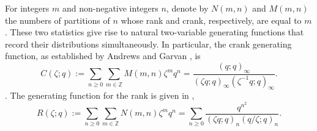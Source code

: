 \documentclass[12pt,oneside,reqno]{amsart}
\numberwithin{equation}{section}
\begin{document}
% 
For integers $m$ and non-negative integers $n$, denote by $N(m,n)$ and $M(m,n)$ the numbers of partitions of $n$ whose rank and crank, respectively, are equal to $m$. These two statistics give rise to natural two-variable generating functions that record their distributions simultaneously. In particular, the crank generating function, as established by Andrews and Garvan \cite{AndrewsGarvan1988}, is
\begin{equation}\label{eq1.4}
	C(\zeta;q)
	:=\sum_{n \geq 0} \sum_{m \in \mathbb{Z}}
	M(m,n)\zeta^m q^n
	=
	\frac{(q;q)_\infty}
	{(\zeta q;q)_\infty(\zeta^{-1}q;q)_\infty}.
\end{equation}.
 The generating function for the rank is given in \cite{AtkinSwinnertonDyer1954},
\begin{equation}\label{eq1.5}
R(\zeta;q)
:=\sum_{n \geq 0} \sum_{m \in \mathbb{Z}}
N(m,n)\zeta^m q^n
=
\sum_{n\geq0}
\frac{q^{n^2}}
{(\zeta q;q)_n(q/\zeta;q)_n}.
\end{equation}
\end{document}
